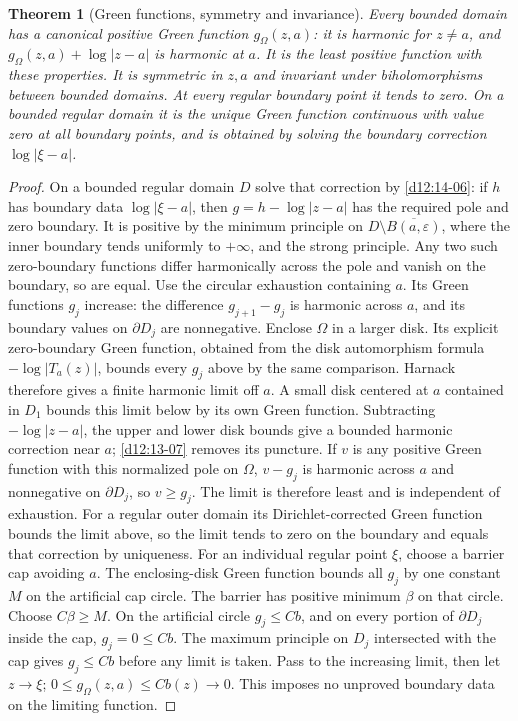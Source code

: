 \documentclass[11pt,a4paper,openany]{book}
\newtheorem{theorem}{Theorem}[chapter]
\theoremstyle{definition}
\theoremstyle{remark}\newtheorem{remark}[theorem]{Remark}
\newcommand{\eps}{\varepsilon}\newcommand{\ee}{\varepsilon}
\newcommand{\family}[1]{}
\begin{document}
\begin{theorem}[Green functions, symmetry and invariance]\family{D12.14.07}\label{d12:14-07}
Every bounded domain has a canonical positive Green function $g_\Omega(z,a)$: it is harmonic for $z\ne a$, and $g_\Omega(z,a)+\log|z-a|$ is harmonic at $a$. It is the least positive function with these properties. It is symmetric in $z,a$ and invariant under biholomorphisms between bounded domains. At every regular boundary point it tends to zero. On a bounded regular domain it is the unique Green function continuous with value zero at all boundary points, and is obtained by solving the boundary correction $\log|\xi-a|$.
\end{theorem}
\begin{proof}
On a bounded regular domain $D$ solve that correction by \cref{d12:14-06}: if $h$ has boundary data $\log|\xi-a|$, then $g=h-\log|z-a|$ has the required pole and zero boundary. It is positive by the minimum principle on $D\setminus\overline{B(a,\eps)}$, where the inner boundary tends uniformly to $+\infty$, and the strong principle. Any two such zero-boundary functions differ harmonically across the pole and vanish on the boundary, so are equal.
Use the circular exhaustion containing $a$. Its Green functions $g_j$ increase: the difference $g_{j+1}-g_j$ is harmonic across $a$, and its boundary values on $\partial D_j$ are nonnegative. Enclose $\Omega$ in a larger disk. Its explicit zero-boundary Green function, obtained from the disk automorphism formula $-\log|T_a(z)|$, bounds every $g_j$ above by the same comparison. Harnack therefore gives a finite harmonic limit off $a$. A small disk centered at $a$ contained in $D_1$ bounds this limit below by its own Green function. Subtracting $-\log|z-a|$, the upper and lower disk bounds give a bounded harmonic correction near $a$; \cref{d12:13-07} removes its puncture.
If $v$ is any positive Green function with this normalized pole on $\Omega$, $v-g_j$ is harmonic across $a$ and nonnegative on $\partial D_j$, so $v\ge g_j$. The limit is therefore least and is independent of exhaustion. For a regular outer domain its Dirichlet-corrected Green function bounds the limit above, so the limit tends to zero on the boundary and equals that correction by uniqueness. For an individual regular point $\xi$, choose a barrier cap avoiding $a$. The enclosing-disk Green function bounds all $g_j$ by one constant $M$ on the artificial cap circle. The barrier has positive minimum $\beta$ on that circle. Choose $C\beta\ge M$. On the artificial circle $g_j\le Cb$, and on every portion of $\partial D_j$ inside the cap, $g_j=0\le Cb$. The maximum principle on $D_j$ intersected with the cap gives $g_j\le Cb$ before any limit is taken. Pass to the increasing limit, then let $z\to\xi$; $0\le g_\Omega(z,a)\le Cb(z)\to0$. This imposes no unproved boundary data on the limiting function.

\end{proof}
\end{document}
